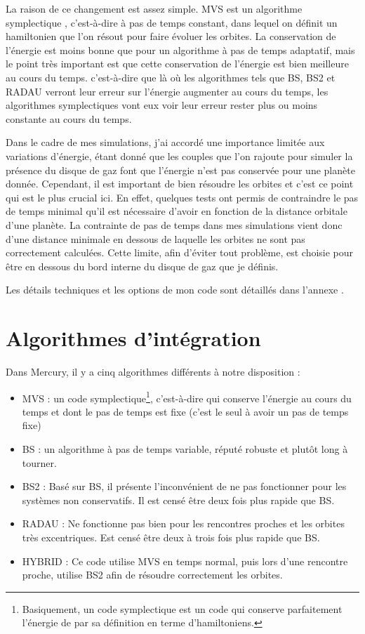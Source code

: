La raison de ce changement est assez simple. MVS est un algorithme symplectique \citep{wisdom1991symplectic}, c'est-à-dire à pas de temps constant, dans lequel on définit un hamiltonien que l'on résout pour faire évoluer les orbites. La conservation de l'énergie est moins bonne que pour un algorithme à pas de temps adaptatif, mais le point très important est que cette conservation de l'énergie est bien meilleure au cours du temps. c'est-à-dire que là où les algorithmes tels que BS, BS2 et RADAU verront leur erreur sur l'énergie augmenter au cours du temps, les algorithmes symplectiques vont eux voir leur erreur rester plus ou moins constante au cours du temps. 

Dans le cadre de mes simulations, j'ai accordé une importance limitée aux variations d'énergie, étant donné que les couples que l'on rajoute pour simuler la présence du disque de gaz font que l'énergie n'est pas conservée pour une planète donnée. Cependant, il est important de bien résoudre les orbites et c'est ce point qui est le plus crucial ici. En effet, quelques tests ont permis de contraindre le pas de temps minimal qu'il est nécessaire d'avoir en fonction de la distance orbitale d'une planète. La contrainte de pas de temps dans mes simulations vient donc d'une distance minimale en dessous de laquelle les orbites ne sont pas correctement calculées. Cette limite, afin d'éviter tout problème, est choisie pour être en dessous du bord interne du disque de gaz que je définis.

Les détails techniques et les options de mon code sont détaillés dans l'annexe .

\section{Algorithmes d'intégration}
Dans Mercury, il y a cinq algorithmes différents à notre disposition :
\begin{itemize}
\item MVS \citep{wisdom1991symplectic} : un code symplectique\footnote{Basiquement, un code symplectique est un code qui conserve parfaitement l'énergie de par sa définition en terme d'hamiltoniens.}, c'est-à-dire qui conserve l'énergie au cours du temps et dont le pas de temps est fixe (c'est le seul à avoir un pas de temps fixe)
\item BS \citep{stoer1980introduction} : un algorithme à pas de temps variable, réputé robuste et plutôt long à tourner.
\item BS2 \citep{press1992numerical} : Basé sur BS, il présente l'inconvénient de ne pas fonctionner pour les systèmes non conservatifs. Il est censé être deux fois plus rapide que BS.
\item RADAU \citep{everhart1985efficient} : Ne fonctionne pas bien pour les rencontres proches et les orbites très excentriques. Est censé être deux à trois fois plus rapide que BS.
\item HYBRID \citep{chambers1999hybrid} : Ce code utilise MVS en temps normal, puis lors d'une rencontre proche, utilise BS2 afin de résoudre correctement les orbites.
\end{itemize}

